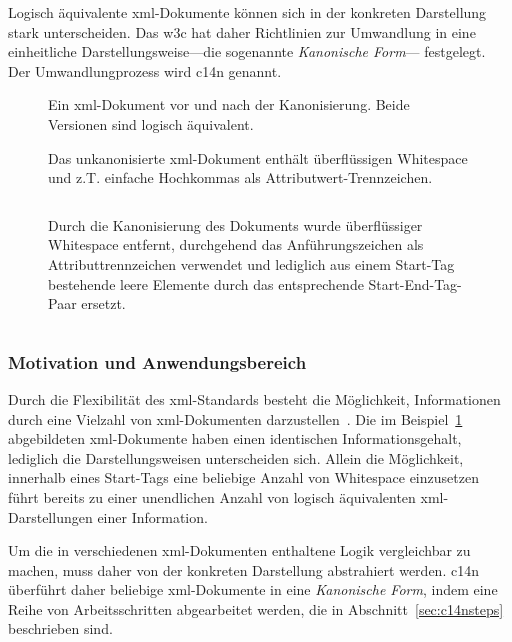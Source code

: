 Logisch äquivalente \acrshort{xml}-Dokumente können sich in der konkreten Darstellung
stark unterscheiden. Das \gls{w3c} hat daher Richtlinien zur Umwandlung in eine
einheitliche Darstellungsweise---die sogenannte \emph{Kanonische Form}---
festgelegt. Der Umwandlungprozess wird \acrfull{c14n} genannt.~\cite{boyer2001c14n}

\begin{figure}[h!]
\begin{example}[Kanonisierung]
    \label{ex:c14n}
    Ein \acrshort{xml}-Dokument vor und nach der Kanonisierung. Beide Versionen sind
    logisch äquivalent.

    Das unkanonisierte \acrshort{xml}-Dokument enthält überflüssigen Whitespace und z.T. einfache Hochkommas als Attributwert-Trennzeichen.
    \inputminted{xml}{ex-c14n-pre.xml}
    Durch die Kanonisierung des Dokuments wurde überflüssiger Whitespace entfernt, durchgehend das Anführungszeichen als Attributtrennzeichen verwendet und lediglich aus einem Start-Tag bestehende leere Elemente durch das entsprechende Start-End-Tag-Paar ersetzt.
    \inputminted{xml}{ex-c14n-post.xml}
\end{example}
\end{figure}

\subsubsection{Motivation und Anwendungsbereich}
\label{sec:c14nscope}

Durch die Flexibilität des \acrshort{xml}-Standards besteht die Möglichkeit, Informationen durch eine Vielzahl von \acrshort{xml}-Dokumenten darzustellen~\cite{siddiqui2002c14n}. Die im Beispiel~\ref{ex:c14n} abgebildeten \acrshort{xml}-Dokumente haben einen identischen Informationsgehalt, lediglich die Darstellungsweisen unterscheiden sich. Allein die Möglichkeit, innerhalb eines Start-Tags eine beliebige Anzahl von Whitespace einzusetzen~\cite[Produktionsregeln 3 und 40]{maler2008xml} führt bereits zu einer unendlichen Anzahl von logisch äquivalenten \acrshort{xml}-Darstellungen einer Information.

Um die in verschiedenen \acrshort{xml}-Dokumenten enthaltene Logik vergleichbar zu machen, muss daher von der konkreten Darstellung abstrahiert werden. \acrlong{c14n} überführt daher beliebige \acrshort{xml}-Dokumente in eine \emph{Kanonische Form}, indem eine Reihe von Arbeitsschritten abgearbeitet werden, die in Abschnitt~\ref{sec:c14nsteps} beschrieben sind.

